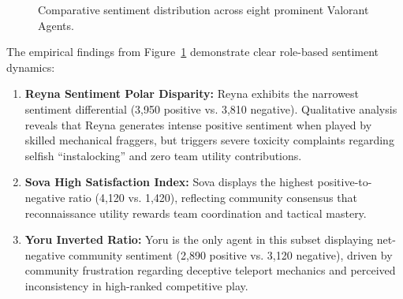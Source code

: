 \begin{figure}[htbp]
\centering
{}
\caption{Comparative sentiment distribution across eight prominent Valorant Agents.}
\label{fig:pgf_agent_sentiment}
\end{figure}

The empirical findings from Figure~\ref{fig:pgf_agent_sentiment} demonstrate clear role-based sentiment dynamics:
\begin{enumerate}
    \item \textbf{Reyna Sentiment Polar Disparity:} Reyna exhibits the narrowest sentiment differential (3,950 positive vs. 3,810 negative). Qualitative analysis reveals that Reyna generates intense positive sentiment when played by skilled mechanical fraggers, but triggers severe toxicity complaints regarding selfish ``instalocking'' and zero team utility contributions.
    \item \textbf{Sova High Satisfaction Index:} Sova displays the highest positive-to-negative ratio (4,120 vs. 1,420), reflecting community consensus that reconnaissance utility rewards team coordination and tactical mastery.
    \item \textbf{Yoru Inverted Ratio:} Yoru is the only agent in this subset displaying net-negative community sentiment (2,890 positive vs. 3,120 negative), driven by community frustration regarding deceptive teleport mechanics and perceived inconsistency in high-ranked competitive play.
\end{enumerate}
